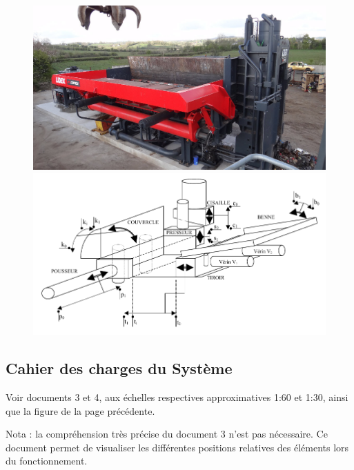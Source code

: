 \begin{figure}[!h]
\begin{minipage}[t]{0.49\linewidth}
 \centering\includegraphics[width=0.9\linewidth]{img/fig1-1}
\end{minipage}\hfill
\begin{minipage}[t]{0.49\linewidth}
 \centering\includegraphics[width=0.9\linewidth]{img/fig1}
\end{minipage}
\end{figure}

\subsection{Cahier des charges du Système}

Voir documents 3 et 4, aux échelles respectives approximatives 1\!:60 et 1\!:30, ainsi que la figure de la page précédente.

Nota : la compréhension très précise du document 3 n'est pas nécessaire. Ce document permet de visualiser les différentes positions relatives des éléments lors du fonctionnement.

